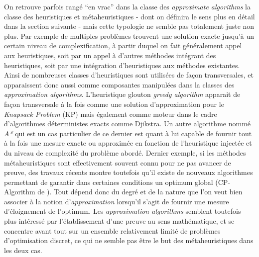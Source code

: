 On retrouve parfois rangé \enquote{en vrac} dans la classe des \textit{approximate algorithms} la classe des heuristiques et métaheuristiques - dont on définira le sens plus en détail dans la section suivante - mais cette typologie ne semble pas totalement juste non plus. Par exemple de multiples problèmes trouvent une solution exacte jusqu'à un certain niveau de complexification, à partir duquel on fait généralement appel aux heuristiques, soit par un appel à d'autres méthodes intégrant des heuristiques, soit par une intégration d'heuristiques aux méthodes existantes. Ainsi de nombreuses classes d'heuristiques sont utilisées de façon transversales, et apparaissent donc aussi comme composantes manipulées dans la classes des \textit{approximation algorithms}. L'heuristique glouton \textit{greedy algorithm}  apparait de façon transversale à la fois comme une solution d'approximation pour le \textit{Knapsack Problem} (KP) mais également comme moteur dans le cadre d'algorithmes déterministes exacts comme Djikstra. Un autre algorithme nommé \textit{A*} qui est un cas particulier de ce dernier est quant à lui capable de fournir tout à la fois une mesure exacte ou approximée en fonction de l'heuristique injectée et du niveau de complexité du problème abordé. Dernier exemple, si les méthodes métaheuristiques sont effectivement souvent connu pour ne pas avancer de preuve, des travaux récents montre toutefois qu'il existe de nouveaux algorithmes permettant de garantir dans certaines conditions un optimum global (CP-Algorithm de \autocite{Reuillon2014}). Tout dépend donc du degré et de la nature que l'on veut bien associer à la notion d'\textit{approximation} lorsqu'il s'agit de fournir une mesure d'éloignement de l'optimum. Les \textit{approximation algorithms} semblent toutefois plus intéressé par l'établissement d'une preuve au sens mathématique, et se concentre avant tout sur un ensemble relativement limité de problèmes d'optimisation discret, ce qui ne semble pas être le but des métaheuristiques dans les deux cas. \autocite[1-6]{Kann1992} \autocite[13-15]{Williamson2011} %


